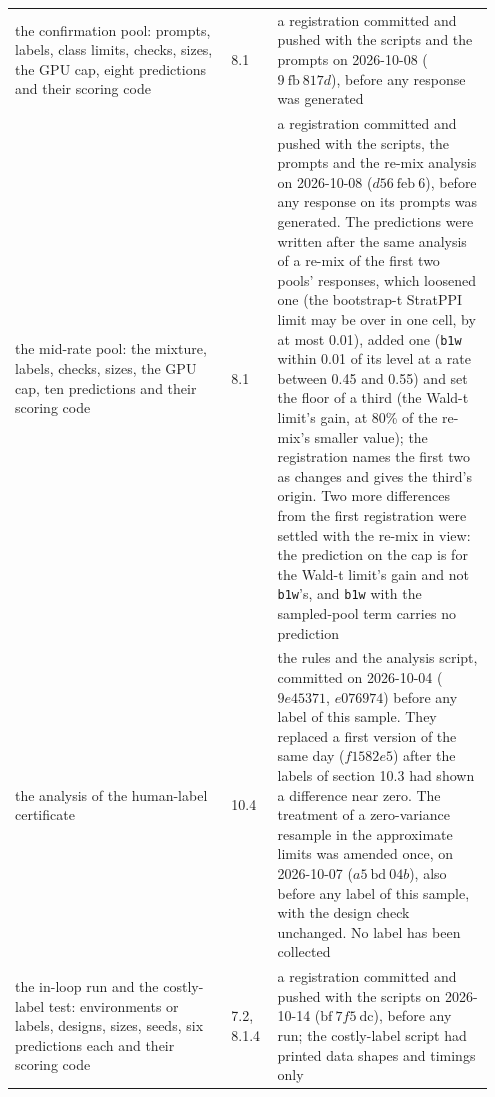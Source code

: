 \documentclass[11pt]{article}
\begin{document}
\begin{longtable}{@{}>{\raggedright\arraybackslash}p{0.428\linewidth}>{\raggedright\arraybackslash}p{0.091\linewidth}>{\raggedright\arraybackslash}p{0.428\linewidth}@{}}
\hspace{0pt}the confirmation pool: prompts, labels, class limits, checks, sizes, the GPU cap, eight predictions and their scoring code & \hspace{0pt}8.1 & \hspace{0pt}a registration committed and pushed with the scripts and the prompts on 2026-10-08 ($9\ \text{fb}\ 817d$), before any response was generated \\
\hspace{0pt}the mid-rate pool: the mixture, labels, checks, sizes, the GPU cap, ten predictions and their scoring code & \hspace{0pt}8.1 & \hspace{0pt}a registration committed and pushed with the scripts, the prompts and the re-mix analysis on 2026-10-08 ($d 56\ \text{feb}\ 6$), before any response on its prompts was generated. The predictions were written after the same analysis of a re-mix of the first two pools' responses, which loosened one (the bootstrap-t StratPPI limit may be over in one cell, by at most 0.01), added one (\texttt{b1w} within 0.01 of its level at a rate between 0.45 and 0.55) and set the floor of a third (the Wald-t limit's gain, at 80\% of the re-mix's smaller value); the registration names the first two as changes and gives the third's origin. Two more differences from the first registration were settled with the re-mix in view: the prediction on the cap is for the Wald-t limit's gain and not \texttt{b1w}'s, and \texttt{b1w} with the sampled-pool term carries no prediction \\
\hspace{0pt}the analysis of the human-label certificate & \hspace{0pt}10.4 & \hspace{0pt}the rules and the analysis script, committed on 2026-10-04 ($9e 45371$, $e 076974$) before any label of this sample. They replaced a first version of the same day ($f 1582e 5$) after the labels of section 10.3 had shown a difference near zero. The treatment of a zero-variance resample in the approximate limits was amended once, on 2026-10-07 ($a 5\ \text{bd}\ 04b$), also before any label of this sample, with the design check unchanged. No label has been collected \\
\hspace{0pt}the in-loop run and the costly-label test: environments or labels, designs, sizes, seeds, six predictions each and their scoring code & \hspace{0pt}7.2, 8.1.4 & \hspace{0pt}a registration committed and pushed with the scripts on 2026-10-14 ($\text{bf}\ 7f 5\ \text{dc}$), before any run; the costly-label script had printed data shapes and timings only \\

\end{longtable}
\end{document}
